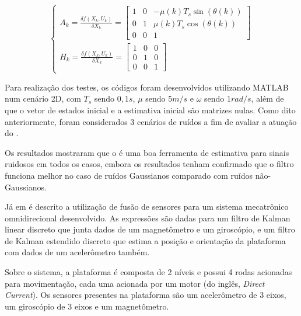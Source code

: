 \documentclass[acronym, symbols, table]{fei}
\begin{document}
	\begin{equation}\label{eq:trab_relacionados_matrizes_jacobianas}
		\begin{cases}
			A_k = \frac{\delta f(X_k, U_k)}{\delta X_k} = \begin{bmatrix}
				1 & 0 & -\mu(k)T_s\sin{(\theta(k))} \\
				0 & 1 & \mu(k)T_s\cos{(\theta(k))}  \\
				0 & 0 & 1
			\end{bmatrix} \\[30pt]
			
			H_k = \frac{\delta f(X_k, U_k)}{\delta X_k} = 
			\begin{bmatrix}
				1 & 0 & 0 \\
				0 & 1 & 0 \\
				0 & 0 & 1 
			\end{bmatrix}		
		\end{cases}
	\end{equation}
	
	Para realização dos testes, os códigos foram desenvolvidos utilizando MATLAB num cenário 2D, com $T_s$ sendo $0,1s$, $\mu$ sendo $5m/s$ e $\omega$ sendo $1rad/s$, além de que o vetor de estados inicial e a estimativa inicial são matrizes nulas. Como dito anteriormente, foram considerados 3 cenários de ruídos a fim de avaliar a atuação do .
	
	Os resultados mostraram que o  é uma boa ferramenta de estimativa para sinais ruidosos em todos os casos, embora os resultados tenham confirmado que o filtro funciona melhor no caso de ruídos Gaussianos comparado com ruídos não-Gaussianos.
	
	Já em \textcite{korotaj2021kalman} é descrito a utilização de fusão de sensores para um sistema mecatrônico omnidirecional desenvolvido. As expressões são dadas para um filtro de Kalman linear discreto que junta dados de um magnetômetro e um giroscópio, e um filtro de Kalman estendido discreto que estima a posição e orientação da plataforma com dados de um acelerômetro também.
	
	Sobre o sistema, a plataforma é composta de 2 níveis e possui 4 rodas acionadas para movimentação, cada uma acionada por um motor  (do inglês, \textit{Direct Current}). Os sensores presentes na plataforma são um acelerômetro de 3 eixos, um giroscópio de 3 eixos e um magnetômetro.
	
\end{document}
